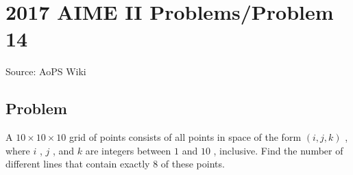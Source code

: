 \documentclass[12pt]{article}
\begin{document}
\section*{{2017 AIME II Problems/Problem 14}}
Source: AoPS Wiki

\subsection*{Problem}
A $10\times10\times10$ grid of points consists of all points in space of the form $(i,j,k)$ , where $i$ , $j$ , and $k$ are integers between $1$ and $10$ , inclusive. Find the number of different lines that contain exactly $8$ of these points.
\end{document}
